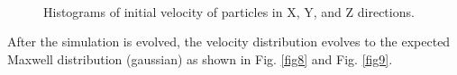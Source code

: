 \documentclass[singlepage,notitlepage,nofootinbib,11pt]{revtex4-1}
\begin{document}
\begin{figure}[h]
  \captionsetup[subfigure]{labelformat=empty}
  \centering
  \\
\hfill
  \caption{\label{fig7} Histograms of initial velocity of particles in X, Y, and Z directions.}
\end{figure}
After the simulation is evolved, the velocity distribution evolves to the expected Maxwell distribution (gaussian) as shown in Fig. \ref{fig8} and Fig. \ref{fig9}.
\end{document}
